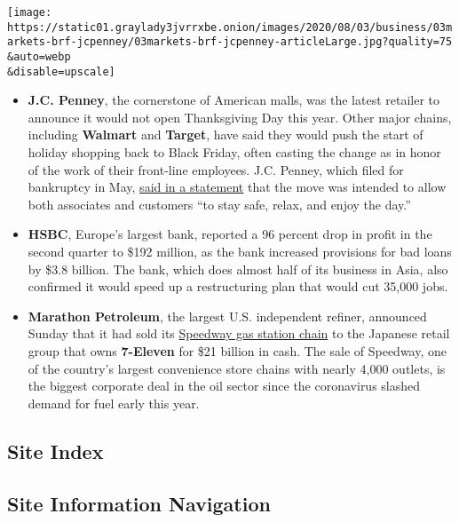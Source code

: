 \texttt{[image: https://static01.graylady3jvrrxbe.onion/images/2020/08/03/business/03markets-brf-jcpenney/03markets-brf-jcpenney-articleLarge.jpg?quality=75\\\&auto=webp\\\&disable=upscale]}

\begin{itemize}
\item
  \textbf{J.C. Penney}, the cornerstone of American malls, was the
  latest retailer to announce it would not open Thanksgiving Day this
  year. Other major chains, including \textbf{Walmart} and
  \textbf{Target}, have said they would push the start of holiday
  shopping back to Black Friday, often casting the change as in honor of
  the work of their front-line employees. J.C. Penney, which filed for
  bankruptcy in May,
  \href{https://companyblog.jcpnewsroom.com/2020/08/03/jcpenney-to-close-stores-on-thanksgiving-day-2020/}{said
  in a statement} that the move was intended to allow both associates
  and customers ``to stay safe, relax, and enjoy the day.''
\item
  \textbf{HSBC}, Europe's largest bank, reported a 96 percent drop in
  profit in the second quarter to \$192 million, as the bank increased
  provisions for bad loans by \$3.8 billion. The bank, which does almost
  half of its business in Asia, also confirmed it would speed up a
  restructuring plan that would cut 35,000 jobs.
\item
  \textbf{Marathon Petroleum}, the largest U.S. independent refiner,
  announced Sunday that it had sold its
  \href{https://www.nytimes3xbfgragh.onion/2020/08/02/business/marathon-petroleum-speedway-7-11.html}{Speedway
  gas station chain} to the Japanese retail group that owns
  \textbf{7-Eleven} for \$21 billion in cash. The sale of Speedway, one
  of the country's largest convenience store chains with nearly 4,000
  outlets, is the biggest corporate deal in the oil sector since the
  coronavirus slashed demand for fuel early this year.
\end{itemize}

\hypertarget{site-index}{%
\subsection{Site Index}\label{site-index}}

\hypertarget{site-information-navigation}{%
\subsection{Site Information
Navigation}\label{site-information-navigation}}

